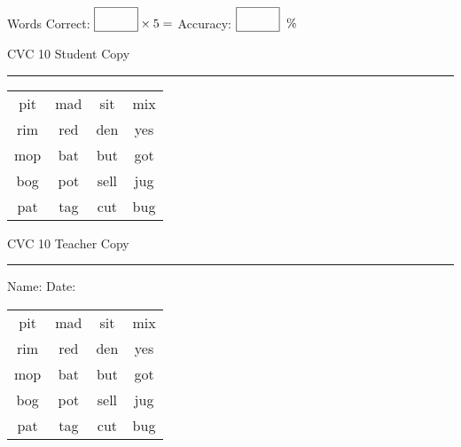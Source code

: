 \documentclass{memoir}
\begin{document}
\normalsize

Words Correct: $\fbox{\phantom{\huge 100}} \times 5 = $ Accuracy: $\fbox{\phantom{\huge 100}}\;\; \%$ 

\vfill

\newpage


\footnotesize \noindent
CVC 10 \hfill Student Copy
\smallskip
\hrule

\huge

\setlength{\tabcolsep}{14pt}
\def\arraystretch{2}

{\selectfont


\begin{vplace}[0.5]
\begin{center}
\begin{tabular}{cccc}
pit & mad & sit & mix \\
rim & red & den & yes \\
mop & bat & but & got \\
bog & pot & sell & jug \\
pat & tag & cut & bug \\
\end{tabular}
\end{center}
\end{vplace}

}

\newpage

\footnotesize \noindent
CVC 10 \hfill Teacher Copy
\smallskip
\hrule

\normalsize

\vfill

\noindent
Name: \underline{\hspace{1.75in}} \hfill Date: \underline{\hspace{1in}}

\huge

{\selectfont


\begin{vplace}[0.5]
\begin{center}
\begin{tabular}{cccc}
pit & mad & sit & mix \\
rim & red & den & yes \\
mop & bat & but & got \\
bog & pot & sell & jug \\
pat & tag & cut & bug \\
\end{tabular}
\end{center}
\end{vplace}



}
\end{document}
